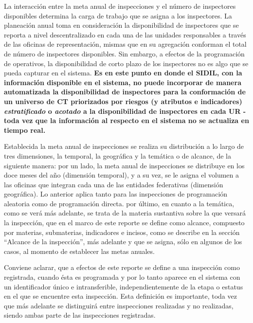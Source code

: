 \documentclass[
]{article}
\begin{document}
La interacción entre la meta anual de inspecciones y el número de inspectores disponibles determina la carga de trabajo que se asigna a los inspectores. La planeación anual toma en consideración la disponibilidad de inspectores que se reporta a nivel descentralizado en cada una de las unidades responsables a través de las oficinas de representación, mismas que en su agregación conforman el total de número de inspectores disponibles. Sin embargo, a efectos de la programación de operativos, la disponibilidad de corto plazo de los inspectores no es algo que se pueda capturar en el sistema. \textbf{Es en este punto en donde el SIDIL, con la información disponible en el sistema, no puede incorporar de manera automatizada la disponibilidad de inspectores para la conformación de un universo de CT priorizados por riesgos (y atributos e indicadores) \emph{estratificado} o \emph{acotado} a la disponibilidad de inspectores en cada UR - toda vez que la información al respecto en el sistema no se actualiza en tiempo real.}

Establecida la meta anual de inspecciones se realiza su distribución a lo largo de tres dimensiones, la temporal, la geográfica y la temática o de alcance, de la siguiente manera: por un lado, la meta anual de inspecciones se distribuye en los doce meses del año (dimensión temporal), y a su vez, se le asigna el volumen a las oficinas que integran cada una de las entidades federativas (dimensión geográfica). Lo anterior aplica tanto para las inspecciones de programación aleatoria como de programación directa. por último, en cuanto a la temática, como se verá más adelante, se trata de la materia sustantiva sobre la que versará la inspección, que en el marco de este reporte se define como alcance, compuesto por materias, submaterias, indicadores e incisos, como se describe en la sección ``Alcance de la inspección'', más adelante y que se asigna, sólo en algunos de los casos, al momento de establecer las metas anuales.

Conviene aclarar, que a efectos de este reporte se define a una inspección como registrada, cuando ésta es programada y por lo tanto aparece en el sistema con un identificador único e intransferible, independientemente de la etapa o estatus en el que se encuentre esta inspección. Esta definición es importante, toda vez que más adelante se distinguirá entre inspecciones realizadas y no realizadas, siendo ambas parte de las inspecciones registradas.
\end{document}
